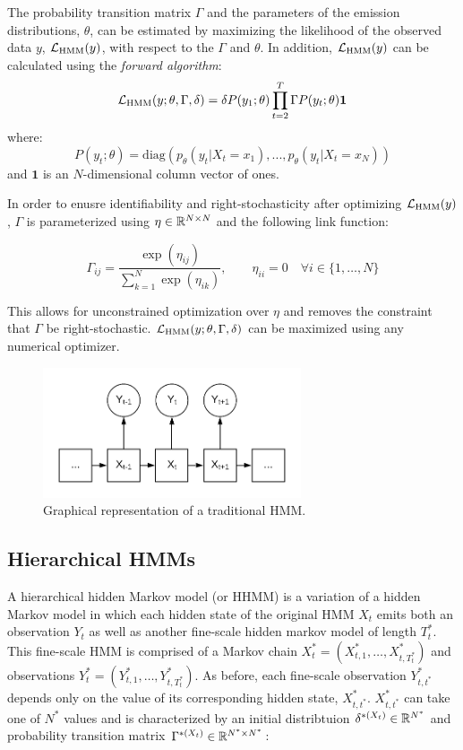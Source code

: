 The probability transition matrix $\Gamma$ and the parameters of the emission distributions, $\theta$, can be estimated by maximizing the likelihood of the observed data $y$, $\mathcal{L}_{\text{HMM}}(y)$, with respect to the $\Gamma$ and $\theta$. In addition, $\mathcal{L}_{\text{HMM}}(y)$ can be calculated using the \textit{forward algorithm}:
%
$$\mathcal{L}_{\text{HMM}}(y;\theta,\Gamma,\delta) = \delta P(y_1;\theta) \prod_{t=2}^T \Gamma P(y_t;\theta) \mathbf{1}$$
%
where:
%
$$P(y_t;\theta) = \text{diag}(p_{\theta}(y_t|X_t = x_1), . . . , p_{\theta}(y_t|X_t = x_N ))$$
%
and $\mathbf{1}$ is an $N$-dimensional column vector of ones.

In order to enusre identifiability and right-stochasticity after optimizing $\mathcal{L}_{\text{HMM}}(y)$, $\Gamma$ is parameterized using $\eta \in \mathbb{R}^{N \times N}$ and the following link function:

$$\Gamma_{ij} = \frac{\exp(\eta_{ij})}{\sum_{k=1}^N \exp(\eta_{ik})}, \qquad \eta_{ii} = 0 \quad \forall i \in \{1, \ldots, N\}$$

This allows for unconstrained optimization over $\eta$ and removes the constraint that $\Gamma$ be right-stochastic. $\mathcal{L}_{\text{HMM}}(y;\theta,\Gamma,\delta)$ can be maximized using any numerical optimizer.

\begin{figure}[h!]
	\centering
	\includegraphics[width=3in]{../Plots/HMM.png}
	\caption{Graphical representation of a traditional HMM.}
	\label{fig:HMM}
\end{figure}


\subsection{Hierarchical HMMs}

A hierarchical hidden Markov model (or HHMM) is a variation of a hidden Markov model in which each hidden state of the original HMM $X_t$ emits both an observation $Y_t$ as well as another fine-scale hidden markov model of length $T^*_t$. This fine-scale HMM is comprised of a Markov chain $X^*_t = (X^*_{t,1}, \ldots, X^*_{t,T^*_t})$ and observations $Y^*_t = (Y^*_{t,1}, \ldots, Y^*_{t,T^*_t})$. As before, each fine-scale observation $Y^*_{t,t^*}$ depends only on the value of its corresponding hidden state, $X^*_{t,t^*}$. $X^*_{t,t^*}$ can take one of $N^*$ values and is characterized by an initial distribtuion $\delta^{*(X_t)} \in \mathbb{R}^{N^*}$ and probability transition matrix $\Gamma^{*(X_t)} \in \mathbb{R}^{N^* \times N^*}$:

